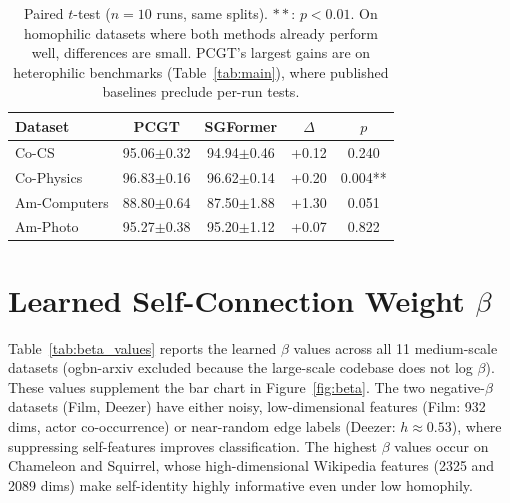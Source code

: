 \begin{table}[t]
\centering
\small
\begin{tabular}{l|cc|cc}
\toprule
\textbf{Dataset} & \textbf{PCGT} & \textbf{SGFormer} & $\Delta$ & $p$ \\
\midrule
Co-CS        & 95.06{\scriptsize$\pm$0.32} & 94.94{\scriptsize$\pm$0.46} & +0.12 & 0.240 \\
Co-Physics   & 96.83{\scriptsize$\pm$0.16} & 96.62{\scriptsize$\pm$0.14} & +0.20 & 0.004** \\
Am-Computers & 88.80{\scriptsize$\pm$0.64} & 87.50{\scriptsize$\pm$1.88} & +1.30 & 0.051 \\
Am-Photo     & 95.27{\scriptsize$\pm$0.38} & 95.20{\scriptsize$\pm$1.12} & +0.07 & 0.822 \\
\bottomrule
\end{tabular}
\caption{Paired $t$-test ($n=10$ runs, same splits). $**$: $p < 0.01$.  On homophilic datasets where both methods already perform well, differences are small.  PCGT's largest gains are on heterophilic benchmarks (Table~\ref{tab:main}), where published baselines preclude per-run tests.}
\label{tab:pvalues}
\end{table}

\section{Learned Self-Connection Weight $\beta$}
\label{app:beta}

Table~\ref{tab:beta_values} reports the learned $\beta$ values across all 11 medium-scale datasets (ogbn-arxiv excluded because the large-scale codebase does not log $\beta$).  These values supplement the bar chart in Figure~\ref{fig:beta}.  The two negative-$\beta$ datasets (Film, Deezer) have either noisy, low-dimensional features (Film: 932 dims, actor co-occurrence) or near-random edge labels (Deezer: $h \approx 0.53$), where suppressing self-features improves classification.  The highest $\beta$ values occur on Chameleon and Squirrel, whose high-dimensional Wikipedia features (2325 and 2089 dims) make self-identity highly informative even under low homophily.

